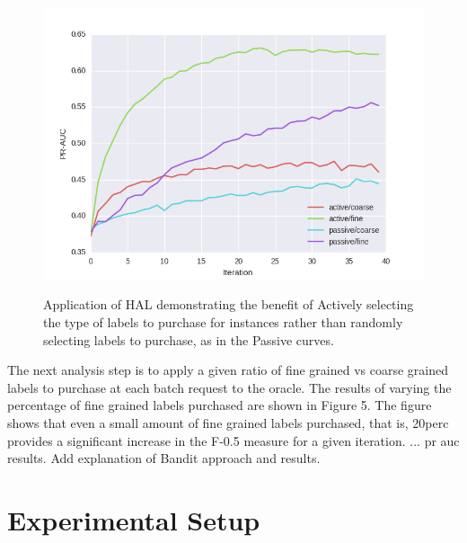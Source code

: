 \documentclass[ms]{nuthesis}
\begin{document}
\FloatBarrier
\begin{figure}[!htb]
	\centering
    \includegraphics[width=1.0\columnwidth]{fig/draft-richmond}
    \label{fig:draft-richmond}
    \caption{Application of HAL demonstrating the benefit of Actively selecting the type
    of labels to purchase for instances rather than randomly selecting labels to purchase,
    as in the Passive curves.}
\end{figure}
\FloatBarrier


\par The next analysis step is to apply a given ratio of fine grained vs coarse grained
labels to purchase at each batch request to the oracle. The results of varying the
percentage of fine grained labels purchased are shown in Figure 5. The figure shows
that even a small amount of fine grained labels purchased, that is, 20perc provides a
significant increase in the F-0.5 measure for a given iteration. ...  pr auc results.
Add explanation of Bandit approach and results.



\chapter{Experimental Setup}\label{chap:math}
\end{document}
